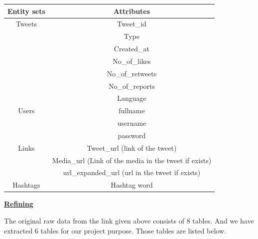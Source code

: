 \documentclass{uofa-eng-assignment}
\begin{document}
\begin{center}
        \begin{tabular}{|c | c|}
            \hline
            Entity sets & Attributes \\ 
            \hline 
            Tweets & Tweet\_id \\ 
             & Type \\
             & Created\_at \\
             & No\_of\_likes \\
             & No\_of\_retweets \\
             & No\_of\_reports \\
             & Language \\
           \hline 
            Users & fullname \\
             & username \\
             & password \\
            \hline 
            Links &  Tweet\_url (link of the tweet)\\
             & Media\_url (Link of the media in the tweet if exists) \\
             & url\_expanded\_url (url in the tweet if exists) \\
            \hline 
            Hashtags & Hashtag word \\
            \hline 
        \end{tabular}
\end{center}

\vspace{2cm}
\begin{center}
    \underline{\textbf{Refining}}
\end{center}

\noindent The original raw data from the link given above consists of 8 tables. And we have extracted 6 tables for our project purpose. Those tables are listed below.
\end{document}
